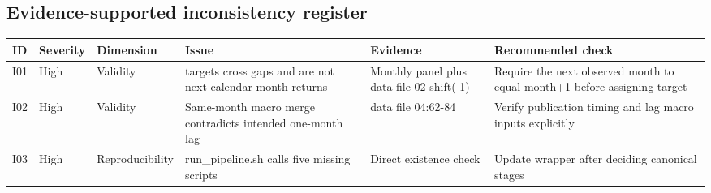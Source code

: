 \documentclass[
  11pt,
  a4paper]{article}
\newcounter{none} %
\begin{document}
\subsection{Evidence-supported inconsistency
register}\label{sec-issue-register}

{\def\LTcaptype{none} %
\begin{landscape}
\scriptsize
\begin{longtable}[]{@{}
  >{\raggedright\arraybackslash}p{}
  >{\raggedright\arraybackslash}p{}
  >{\raggedright\arraybackslash}p{}
  >{\raggedright\arraybackslash}p{}
  >{\raggedright\arraybackslash}p{}
  >{\raggedright\arraybackslash}p{}@{}}
\toprule\noalign{}
\begin{minipage}[b]{\linewidth}\raggedright
ID
\end{minipage} & \begin{minipage}[b]{\linewidth}\raggedright
Severity
\end{minipage} & \begin{minipage}[b]{\linewidth}\raggedright
Dimension
\end{minipage} & \begin{minipage}[b]{\linewidth}\raggedright
Issue
\end{minipage} & \begin{minipage}[b]{\linewidth}\raggedright
Evidence
\end{minipage} & \begin{minipage}[b]{\linewidth}\raggedright
Recommended check
\end{minipage} \\
\midrule\noalign{}
\endhead
\bottomrule\noalign{}
\endlastfoot
I01 & High & Validity & 26 targets cross gaps and are not
next-calendar-month returns & Monthly panel plus data file 02 shift(-1)
& Require the next observed month to equal month+1 before assigning
target \\
I02 & High & Validity & Same-month macro merge contradicts intended
one-month lag & data file 04:62-84 & Verify publication timing and lag
macro inputs explicitly \\
I03 & High & Reproducibility & run\_\allowbreak{}pipeline.sh calls five missing
scripts & Direct existence check & Update wrapper after deciding
canonical stages \\

\end{longtable}
\end{landscape}}
\end{document}
